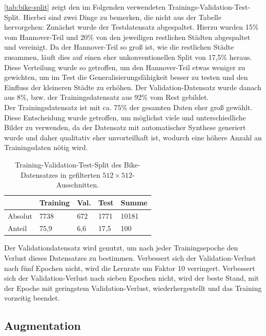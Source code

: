 \autoref{tab:bike-split} zeigt den im Folgenden verwendeten Trainings-Validation-Test-Split. 
Hierbei sind zwei Dinge zu bemerken, die nicht aus der Tabelle hervorgehen: 
Zunächst wurde der Testdatensatz abgespaltet. Hierzu wurden 15\% vom Hannover-Teil und 
20\% von den jeweiligen restlichen Städten abgespaltet und vereinigt. Da der Hannover-Teil so groß ist, wie die restlichen 
Städte zusammen, läuft dies auf einen eher unkonventionellen Split von 17,5\% heraus. Diese Verteilung wurde so getroffen, 
um den Hannover-Teil etwas weniger zu gewichten, um im Test die Generalisierungsfähigkeit besser zu testen 
und den Einfluss der kleineren Städte zu erhöhen. Der Validation-Datensatz wurde danach aus 8\%, 
bzw. der Trainingsdatensatz aus 92\% vom Rest gebildet. \\
Der Trainingsdatensatz ist mit ca. 75\% der gesamten Daten eher groß gewählt. Diese Entscheidung wurde getroffen,
um möglichst viele und unterschiedliche Bilder zu verwenden, da der Datensatz mit automatischer Synthese 
generiert wurde und daher qualitativ eher unvorteilhaft ist, wodurch eine höhere Anzahl an Trainingsdaten nötig wird.

\begin{table}
	\centering
	\begin{tabular}{l|l|l|l|l}
		& Training & Val. & Test & Summe \\
		\midrule
		Absolut & 7738 & 672 & 1771 & 10181 \\
		Anteil & 75,9 & 6,6 & 17,5 & 100 \\ 
	\end{tabular}
	\caption{Training-Validation-Test-Split des Bike-Datensatzes in gefilterten $512 \times 512$-Ausschnitten.}
	\label{tab:bike-split}
\end{table}

Der Validationdatensatz wird genutzt, um nach jeder Trainingsepoche den Verlust dieses Datensatzes zu bestimmen. 
Verbessert sich der Validation-Verlust nach fünf Epochen nicht, wird die Lernrate um Faktor 10 verringert. 
Verbessert sich der Validation-Verlust nach sieben Epochen nicht, wird der beste Stand, mit der Epoche mit geringstem 
Validation-Verlust, wiederhergestellt und das Training vorzeitig beendet.  


\subsection{Augmentation}

